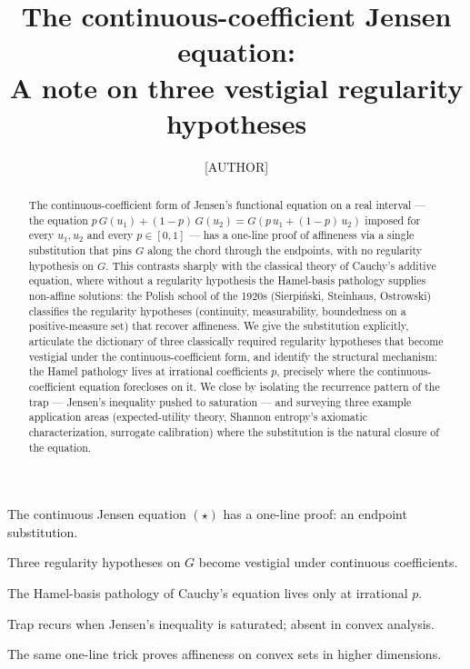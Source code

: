 \documentclass[review,12pt,a4paper]{elsarticle}
\theoremstyle{remark}
\begin{document}
\begin{frontmatter}

\title{The continuous-coefficient Jensen equation:\\
       A note on three vestigial regularity hypotheses}

\author[inst1]{[AUTHOR]}


\begin{abstract}
The continuous-coefficient form of Jensen's functional equation on a real
interval --- the equation $p\,G(u_1)+(1-p)\,G(u_2)=G(p\,u_1+(1-p)\,u_2)$
imposed for every $u_1,u_2$ and every $p\in[0,1]$ --- has a one-line proof
of affineness via a single substitution that pins $G$ along the chord
through the endpoints, with no regularity hypothesis on $G$. This
contrasts sharply with the classical theory of Cauchy's additive
equation, where without a regularity hypothesis the Hamel-basis pathology
supplies non-affine solutions: the Polish school of the 1920s
(Sierpi\'nski, Steinhaus, Ostrowski) classifies the regularity hypotheses
(continuity, measurability, boundedness on a positive-measure set) that
recover affineness. We give the substitution explicitly, articulate
the dictionary of three classically required regularity hypotheses that
become vestigial under the continuous-coefficient form, and identify the
structural mechanism: the Hamel pathology lives at irrational coefficients
$p$, precisely where the continuous-coefficient equation forecloses on it.
We close by isolating the recurrence pattern of the trap --- Jensen's
inequality pushed to saturation --- and surveying three example application
areas (expected-utility theory, Shannon entropy's axiomatic
characterization, surrogate calibration) where the substitution is
the natural closure of the equation.
\end{abstract}

\begin{highlights}
\item The continuous Jensen equation $(\star)$ has a one-line proof: an endpoint substitution.
\item Three regularity hypotheses on $G$ become vestigial under continuous coefficients.
\item The Hamel-basis pathology of Cauchy's equation lives only at irrational $p$.
\item Trap recurs when Jensen's inequality is saturated; absent in convex analysis.
\item The same one-line trick proves affineness on convex sets in higher dimensions.
\end{highlights}


\end{frontmatter}
\end{document}
